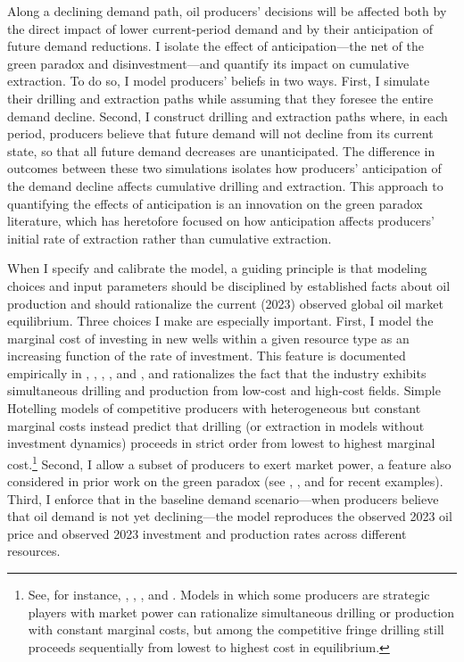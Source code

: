 \documentclass[12pt]{article}
\begin{document}
Along a declining demand path, oil producers' decisions will be affected both by the direct impact of lower current-period demand and by their anticipation of future demand reductions. I isolate the effect of anticipation---the net of the green paradox and disinvestment---and quantify its impact on cumulative extraction. To do so, I model producers' beliefs in two ways. First, I simulate their drilling and extraction paths while assuming that they foresee the entire demand decline. Second, I construct drilling and extraction paths where, in each period, producers believe that future demand will not decline from its current state, so that all future demand decreases are unanticipated. The difference in outcomes between these two simulations isolates how producers' anticipation of the demand decline affects cumulative drilling and extraction. This approach to quantifying the effects of anticipation is an innovation on the green paradox literature, which has heretofore focused on how anticipation affects producers' initial rate of extraction rather than cumulative extraction.

When I specify and calibrate the model, a guiding principle is that modeling choices and input parameters should be disciplined by established facts about oil production and should rationalize the current (2023) observed global oil market equilibrium. Three choices I make are especially important. First, I model the marginal cost of investing in new wells within a given resource type as an increasing function of the rate of investment. This feature is documented empirically in \cite{kaisersnyder2012}, \cite{kellogg2014}, \cite{toewsnaumov2015}, \cite{aks2018}, and \cite{Vreugdenhil2024}, and rationalizes the fact that the industry exhibits simultaneous drilling and production from low-cost and high-cost fields. Simple Hotelling models of competitive producers with heterogeneous but constant marginal costs instead predict that drilling (or extraction in models without investment dynamics) proceeds in strict order from lowest to highest marginal cost.\footnote{See, for instance, \cite{Herfindahl1967}, \cite{AskerEtAl2019}, \cite{healschlenker}, and \cite{askeretal2024}. Models in which some producers are strategic players with market power can rationalize simultaneous drilling or production with constant marginal costs, but among the competitive fringe drilling still proceeds sequentially from lowest to highest cost in equilibrium.} Second, I allow a subset of producers to exert market power, a feature also considered in prior work on the green paradox (see \cite{benchekrounetal2019}, \cite{curuksen2023}, and \cite{vanderMeijdenetal2023} for recent examples). Third, I enforce that in the baseline demand scenario---when producers believe that oil demand is not yet declining---the model reproduces the observed 2023 oil price and observed 2023 investment and production rates across different resources.
\end{document}
